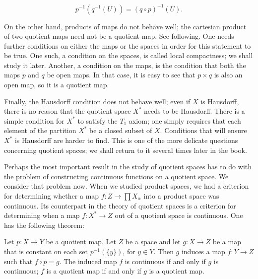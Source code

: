 \[
p^{-1}( {q^{-1}( U) }) = {( q \circ p) }^{-1}( U).
\]

On the other hand, products of maps do not behave well; the cartesian product of two quotient maps need not be a quotient map. See  following. One needs further conditions on either the maps or the spaces in order for this statement to be true. One such, a condition on the spaces, is called local compactness; we shall study it later. Another, a condition on the maps, is the condition that both the maps \(p\) and \(q\) be open maps. In that case, it is easy to see that \(p \times q\) is also an open map, so it is a quotient map.

Finally, the Hausdorff condition does not behave well; even if \(X\) is Hausdorff, there is no reason that the quotient space \(X^{ * }\) needs to be Hausdorff. There is a simple condition for \(X^{ * }\) to satisfy the \(T_{1}\) axiom; one simply requires that each element of the partition \(X^{ * }\) be a closed subset of \(X\). Conditions that will ensure \(X^{ * }\) is Hausdorff are harder to find. This is one of the more delicate questions concerning quotient spaces; we shall return to it several times later in the book.

Perhaps the most important result in the study of quotient spaces has to do with the problem of constructing continuous functions on a quotient space. We consider that problem now. When we studied product spaces, we had a criterion for determining whether a map \(f : Z \rightarrow \prod {X}_{\alpha }\) into a product space was continuous. Its counterpart in the theory of quotient spaces is a criterion for determining when a map \(f : X^{ * } \rightarrow Z\) out of a quotient space is continuous. One has the following theorem:

\begin{theorem}
\label{thm:\thetheorem}
 Let \(p : X \rightarrow Y\) be a quotient map. Let \(Z\) be a space and let \(g : X \rightarrow Z\) be a map that is constant on each set \(p^{-1}( {\{ y\} })\), for \(y \in Y\). Then \(g\) induces a map \(f : Y \rightarrow Z\) such that \(f \circ p = g\). The induced map \(f\) is continuous if and only if \(g\) is continuous; \(f\) is a quotient map if and only if \(g\) is a quotient map.
\par\nopagebreak
\begin{center}
	\label{fig:com_22_2}
\end{center}
\par\nopagebreak
\end{theorem}

